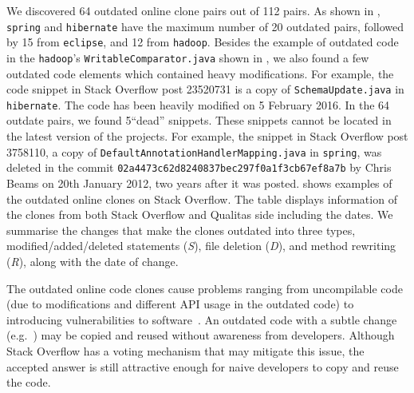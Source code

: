 \documentclass[sigconf,review, anonymous]{acmart}
\begin{document}
We discovered 64 outdated online clone pairs out of 112 pairs. As shown in , {\small{\texttt{spring}}} and {\small{\texttt{hibernate}}} have the maximum number of 20 outdated pairs, followed by 15 from {\small{\texttt{eclipse}}}, and 12 from {\small{\texttt{hadoop}}}. Besides the example of outdated code in the {\small{\texttt{hadoop}}}'s {\small{\texttt{WritableComparator.java}}} shown in , we also found a few outdated code elements which contained heavy modifications. For example, the code snippet in Stack Overflow post 23520731 is a copy of {\small{\texttt{SchemaUpdate.java}}} in {\small{\texttt{hibernate}}}. The code has been heavily modified on 5 February 2016. In the 64 outdate pairs, we found 5``dead'' snippets. These snippets cannot be located in the latest version of the projects. For example, the snippet in Stack Overflow post 3758110, a copy of {\small{\texttt{DefaultAnnotationHandlerMapping.java}}} in {\small{\texttt{spring}}}, was deleted in the commit {\small{\texttt{02a4473c62d8240837bec297f0a1f3cb67ef8a7b}}} by Chris Beams on 20th January 2012, two years after it was posted. %
 shows examples of the outdated online clones on Stack Overflow. The table displays information of the clones from both Stack Overflow and Qualitas side including the dates. We summarise the changes that make the clones outdated into three types, modified/added/deleted statements (\textit{S}), file deletion (\textit{D}), and method rewriting (\textit{R}), along with the date of change.

The outdated online code clones cause problems ranging from uncompilable code (due to modifications and different API usage in the outdated code) to introducing vulnerabilities to software~\cite{Xia2014}. An outdated code with a subtle change (e.g.~) may be copied and reused without awareness from developers. Although Stack Overflow has a voting mechanism that may mitigate this issue, the accepted answer is still attractive enough for naive developers to copy and reuse the code.
\end{document}
